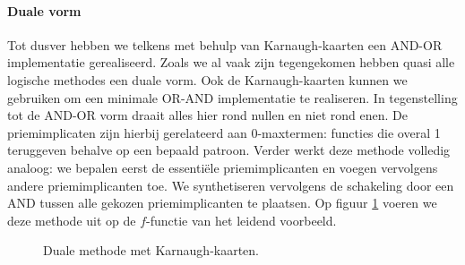 \paragraph{Duale vorm}
Tot dusver hebben we telkens met behulp van Karnaugh-kaarten een AND-OR implementatie gerealiseerd. Zoals we al vaak zijn tegengekomen hebben quasi alle logische methodes een duale vorm. Ook de Karnaugh-kaarten kunnen we gebruiken om een minimale OR-AND implementatie te realiseren. In tegenstelling tot de AND-OR vorm draait alles hier rond nullen en niet rond enen. De priemimplicaten zijn hierbij gerelateerd aan 0-maxtermen: functies die overal 1 teruggeven behalve op een bepaald patroon. Verder werkt deze methode volledig analoog: we bepalen eerst de essenti\"ele priemimplicanten en voegen vervolgens andere priemimplicanten toe. We synthetiseren vervolgens de schakeling door een AND tussen alle gekozen priemimplicanten te plaatsen. Op figuur \ref{fig:karnaughKaartenVoorbeeldDualeVorm} voeren we deze methode uit op de $f$-functie van het leidend voorbeeld.
\begin{figure}[hbt]
\centering
{}
\caption{Duale methode met Karnaugh-kaarten.}
\label{fig:karnaughKaartenVoorbeeldDualeVorm}
\end{figure}
